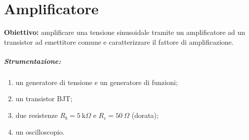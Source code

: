 \chapter{Amplificatore}

\textbf{Obiettivo:} amplificare una tensione sinusoidale tramite un amplificatore ad un transistor ad emettitore comune e caratterizzare il fattore di amplificazione.

\paragraph{Strumentazione:}
\begin{enumerate}
    \item un generatore di tensione e un generatore di funzioni;
    \item un transistor BJT;
    \item due resistenze $R_b=\SI{5}{\kilo\Omega}$ e $R_c=\SI{50}{\Omega}$ (dorata);
    \item un oscilloscopio. 
\end{enumerate}

